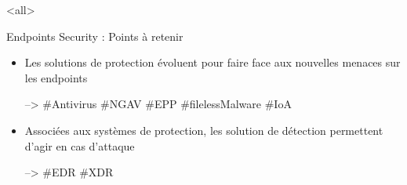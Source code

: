 \mode<all>{\texframe
{Endpoints Security : Points à retenir} %
{} %
{
\begin{itemize}
    \item Les solutions de protection évoluent pour faire face aux nouvelles menaces sur les endpoints
    
    --> \#Antivirus \#NGAV \#EPP \#filelessMalware \#IoA
    
    \item Associées aux systèmes de protection, les solution de détection permettent d'agir en cas d'attaque
    
    --> \#EDR \#XDR
  
\end{itemize}
}}













